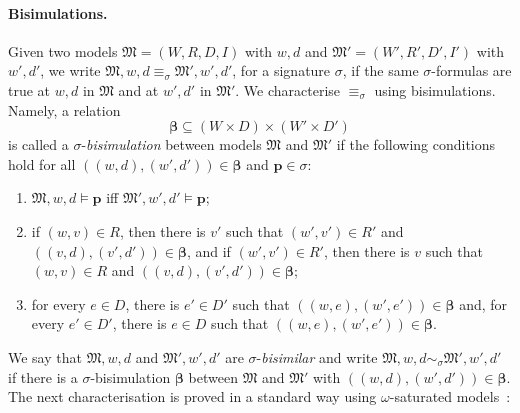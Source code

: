 \documentclass[10pt,a4paper]{amsart}
\theoremstyle{plain}
\theoremstyle{definition}
\newcommand{\nz}[1]{\textcolor{blue}{\bf!}%
	\marginpar[\parbox{15mm}{\raggedleft\scriptsize\textcolor{blue}{#1}}]%
	{\parbox{15mm}{\raggedright\scriptsize\textcolor{blue}{#1}}}}
\newcommand{\bs}{\boldsymbol{\beta}}
\newcommand{\fform}[1]{\boldsymbol{#1}}
\newcommand{\pvar}{\fform{p}}
\begin{document}
\paragraph{Bisimulations.}
Given two models $\mathfrak{M}= (W,R,D,I)$ with $w,d$ and $\mathfrak{M}'= (W',R',D',I')$ with $w',d'$,  we write \mbox{$\mathfrak{M},w,d  \equiv_{\sigma} \mathfrak{M}',w',d'$}, for a signature $\sigma$, if the same $\sigma$-formulas are true at $w,d$ in $\mathfrak M$ and at $w',d'$ in $\mathfrak M'$. 
%
%
We characterise $\equiv_{\sigma}$ using bisimulations. 
%
Namely, a relation 
%
$$
\bs \subseteq (W\times D) \times (W'\times D')
$$
%
is called a $\sigma$-\emph{bisimulation} between models $\mathfrak M$ and $\mathfrak M'$  if the following conditions hold for all $((w,d),(w',d'))\in \bs$ and $\pvar\in \sigma$:  
%
\begin{enumerate}[style=multiline,leftmargin=0.7cm]
\item[\textbf{(a)}] $\mathfrak M,w,d \models \pvar$ iff $\mathfrak M',w',d' \models \pvar$;
	
\item[\textbf{(w)}] if $(w,v)\in R$, then there is $v'$ such that $(w',v')\in R'$ and $((v,d),(v',d'))\in \bs$, and if $(w',v')\in R'$, then there is $v$ such that $(w,v)\in R$ and $((v,d),(v',d'))\in \bs$;
	
\item[\textbf{(d)}] for every $e\in D$, there is $e'\in D'$ such that $((w,e),(w',e'))\in \bs$ and, for every $e'\in D'$, there is $e\in D$ such that $((w,e),(w',e'))\in \bs$.
\end{enumerate}
%
We say that $\mathfrak{M},w,d$ and $\mathfrak{M}',w',d'$ are $\sigma$-\emph{bisimilar} and write 
%
$\mathfrak{M},w,d  \sim_{\sigma} \mathfrak{M}',w',d'$
%
if there is a $\sigma$-bisimulation $\bs$ between $\mathfrak{M}$ and $\mathfrak{M}'$ with $((w,d),(w',d')) \in \bs$. 
%
The next characterisation is proved in a standard way using $\omega$-saturated models~\cite{modeltheory,goranko20075}:
\end{document}
